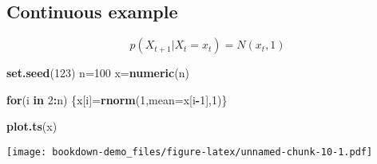 \documentclass[]{book}
\newenvironment{Shaded}{\begin{snugshade}}{\end{snugshade}}
\newcommand{\KeywordTok}[1]{\textcolor[rgb]{0.13,0.29,0.53}{\textbf{#1}}}
\newcommand{\DataTypeTok}[1]{\textcolor[rgb]{0.13,0.29,0.53}{#1}}
\newcommand{\DecValTok}[1]{\textcolor[rgb]{0.00,0.00,0.81}{#1}}
\newcommand{\ControlFlowTok}[1]{\textcolor[rgb]{0.13,0.29,0.53}{\textbf{#1}}}
\newcommand{\OperatorTok}[1]{\textcolor[rgb]{0.81,0.36,0.00}{\textbf{#1}}}
\newcommand{\NormalTok}[1]{#1}
\begin{document}
\subsection{Continuous example}\label{continuous-example}

\[p(X_{t+1}| X_t=x_t)=N(x_t,1)\]

\begin{Shaded}
\begin{Highlighting}[]
\KeywordTok{set.seed}\NormalTok{(}\DecValTok{123}\NormalTok{)}
\NormalTok{n=}\DecValTok{100}
\NormalTok{x=}\KeywordTok{numeric}\NormalTok{(n)}

\ControlFlowTok{for}\NormalTok{(i }\ControlFlowTok{in} \DecValTok{2}\OperatorTok{:}\NormalTok{n)}
\NormalTok{\{x[i]=}\KeywordTok{rnorm}\NormalTok{(}\DecValTok{1}\NormalTok{,}\DataTypeTok{mean=}\NormalTok{x[i}\OperatorTok{-}\DecValTok{1}\NormalTok{],}\DecValTok{1}\NormalTok{)\}}

\KeywordTok{plot.ts}\NormalTok{(x)}
\end{Highlighting}
\end{Shaded}

\texttt{[image: bookdown-demo\_files/figure-latex/unnamed-chunk-10-1.pdf]}


\end{document}
